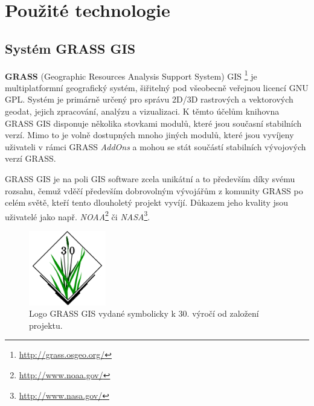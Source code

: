 \documentclass[a4paper,12pt,oneside]{report}
\begin{document}
\setcounter{footnote}{1}



\newpage
\setcounter{footnote}{1}
\section{Použité technologie}

\subsection{Systém GRASS GIS}
\textbf{GRASS} (Geographic Resources Analysis Support System) GIS
\footnote{\url{http://grass.osgeo.org/}} je multiplatformní
geografický systém, šiřitelný pod všeobecně veřejnou licencí    \acs{GNU
  GPL}. Systém je primárně určený pro správu 2D/3D rastrových a
vektorových geodat, jejich zpracování, analýzu a vizualizaci. K těmto
účelům knihovna GRASS GIS disponuje několika stovkami modulů, které
jsou současní stabilních verzí. Mimo to je volně dostupných mnoho
jiných modulů, které jsou vyvíjeny uživateli v rámci GRASS
\textit{AddOns} a mohou se stát součástí stabilních vývojových verzí
GRASS.

GRASS GIS je na poli GIS software zcela unikátní a to především díky
svému rozsahu, čemuž vděčí především dobrovolným vývojářům z komunity
GRASS po celém světě, kteří tento dlouholetý projekt vyvíjí. Důkazem jeho
kvality jsou uživatelé jako např.
\textit{NOAA}\footnote{\url{http://www.noaa.gov/}} či
\textit{NASA}\footnote{\url{http://www.nasa.gov/}}.

\begin{figure}[h!]
    \centering
    \includegraphics[width=0.3\textwidth]{./img/grass/grasslogo.png}
    \caption[Logo GRASS]{\centering Logo GRASS GIS vydané symbolicky k 30. výročí od založení projektu. \footnotemark }
 \end{figure}   
\end{document}
